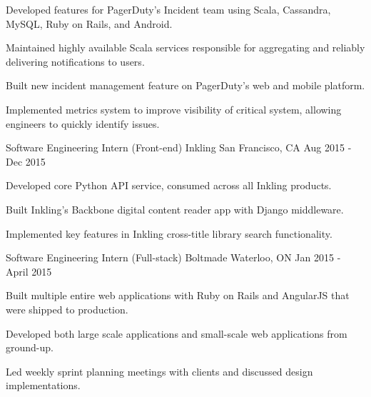 \begin{cventries}
{\begin{cvitems}
      \item {Developed features for PagerDuty's Incident team using Scala, Cassandra, MySQL, Ruby on Rails, and Android.}
      \item {Maintained highly available Scala services responsible for aggregating and reliably delivering notifications to users.}
      \item {Built new incident management feature on PagerDuty's web and mobile platform.}
      \item {Implemented metrics system to improve visibility of critical system, allowing engineers to quickly identify issues. }
      \end{cvitems}
    }

  \cventry
  {Software Engineering Intern (Front-end)} %
    {Inkling} %
    {San Francisco, CA} %
    {Aug 2015 - Dec 2015} %
    {
      \begin{cvitems} %
      \item {Developed core Python API service, consumed across all Inkling products.}
      \item {Built Inkling's Backbone digital content reader app with Django middleware.}
      \item {Implemented key features in Inkling cross-title library search functionality.}
      \end{cvitems}
    }

  \cventry
  {Software Engineering Intern (Full-stack)} %
    {Boltmade} %
    {Waterloo, ON} %
    {Jan 2015 - April 2015} %
    {
      \begin{cvitems} %
      \item {Built multiple entire web applications with Ruby on Rails and AngularJS that were shipped to production.}
      \item {Developed both large scale applications and small-scale web applications from ground-up.}
      \item {Led weekly sprint planning meetings with clients and discussed design implementations.}
  \end{cvitems} 
    }

\end{cventries}
